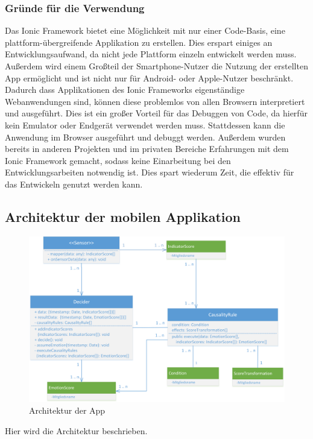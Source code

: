\subsubsection{Gründe für die Verwendung}
Das Ionic Framework bietet eine Möglichkeit mit nur einer Code-Basis, eine plattform-übergreifende Applikation zu erstellen. Dies erspart einiges an Entwicklungsaufwand, da nicht jede Plattform einzeln entwickelt werden muss. Außerdem wird einem Großteil der Smartphone-Nutzer die Nutzung der erstellten App ermöglicht und ist nicht nur für Android- oder Apple-Nutzer beschränkt. \newline
Dadurch dass Applikationen des Ionic Frameworks eigenständige Webanwendungen sind, können diese problemlos von allen Browsern interpretiert und ausgeführt. Dies ist ein großer Vorteil für das Debuggen von Code, da hierfür kein Emulator oder Endgerät verwendet werden muss. Stattdessen kann die Anwendung im Browser ausgeführt und debuggt werden. \newline
Außerdem wurden bereits in anderen Projekten und im privaten Bereiche Erfahrungen mit dem Ionic Framework gemacht, sodass keine Einarbeitung bei den Entwicklungsarbeiten notwendig ist. Dies spart wiederum Zeit, die effektiv für das Entwickeln genutzt werden kann. 
\subsection{Architektur der mobilen Applikation}
\begin{figure}[h]
	\centering
	\includegraphics[width=16cm]{Bilder/architecture.png}
	\caption[Architektur der App]{Architektur der App}
\end{figure}%
\newpage Hier wird die Architektur beschrieben.